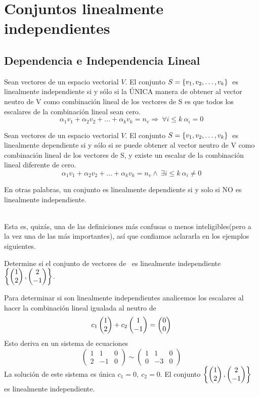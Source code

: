 \chapter{Conjuntos linealmente independientes}

\section{Dependencia e Independencia Lineal}
\begin{dfn}
Sean  vectores de un espacio vectorial $V$. El conjunto $S= \lbrace v_1, v_2, \ldots, v_k \rbrace$\ es linealmente independiente si y s\'olo si la \'UNICA manera de obtener al vector neutro de V como combinaci\'on lineal de los vectores de S es que todos los escalares de la combinaci\'on lineal sean cero.
\[\alpha_1 v_1+
\alpha_2 v_2+
\ldots+
\alpha_k v_k =
n_v
\Rightarrow\ 
\forall i \leq k
\ \alpha_i=0
\] 
\end{dfn}
\begin{dfn}
Sean  vectores de un espacio vectorial $V$. El conjunto $S= \lbrace v_1, v_2, \ldots, v_k \rbrace$\ es linealmente dependiente si y s\'olo si se puede obtener al vector neutro de V como combinaci\'on lineal de los vectores de S, y existe un escalar de la combinaci\'on lineal diferente de cero.
\[\alpha_1 v_1+
\alpha_2 v_2+
\ldots+
\alpha_k v_k =
n_v
\wedge\ 
\exists i \leq k
\ \alpha_i\neq 0
\] 
\end{dfn}
En otras palabras, un conjunto es linealmente dependiente si y solo si NO  es linealmente independiente.

~\\
Esta es, quiz\'as, una de las definiciones m\'as confusas o menos inteligibles(pero a la vez una de las m\'as importantes), as\'i que confiamos aclararla en los ejemplos siguientes.
~\\
\begin{ejemplo}
Determine si el conjunto de vectores de \rdos\  es linealmente independiente $\left\{
\begin{pmatrix} 1\\ 2\\ \end{pmatrix} , \begin{pmatrix} 2\\ -1\\ \end{pmatrix} \right\}$.
\end{ejemplo}

Para determinar si son linealmente independientes analicemos los escalares al hacer la combinaci\'on lineal igualada al neutro de \rdos
\[c_1\begin{pmatrix} 1\\ 2\\ \end{pmatrix} +
c_2\begin{pmatrix} 1\\ -1\\ \end{pmatrix} =
\begin{pmatrix} 0\\ 0\\ \end{pmatrix} \]
Esto deriva en un sistema de ecuaciones
\[
\left(
\begin{array}{rr|r}
1&1&0\\
2&-1&0
\end{array}
\right)
\sim
\left(
\begin{array}{rr|r}
1&1&0\\
0&-3&0
\end{array}
\right)
\]
La soluci\'on de este sistema es \'unica $c_1=0,\ c_2=0$. El conjunto $\left\{
\begin{pmatrix} 1\\ 2\\ \end{pmatrix} , \begin{pmatrix} 2\\ -1\\ \end{pmatrix} \right\}$ es linealmente independiente.


